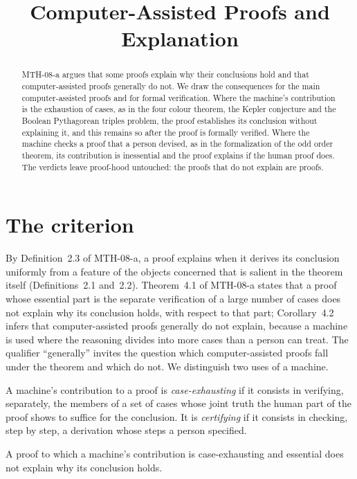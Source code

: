 \documentclass{situationist-preprint}
\title{Computer-Assisted Proofs and Explanation}
\begin{document}
\maketitle

\begin{abstract}
MTH-08-a argues that some proofs explain why their conclusions hold and that computer-assisted proofs generally do not. We draw the consequences for the main computer-assisted proofs and for formal verification. Where the machine's contribution is the exhaustion of cases, as in the four colour theorem, the Kepler conjecture and the Boolean Pythagorean triples problem, the proof establishes its conclusion without explaining it, and this remains so after the proof is formally verified. Where the machine checks a proof that a person devised, as in the formalization of the odd order theorem, its contribution is inessential and the proof explains if the human proof does. The verdicts leave proof-hood untouched: the proofs that do not explain are proofs.
\end{abstract}

\section{The criterion}

By Definition~2.3 of MTH-08-a, a proof explains when it derives its conclusion uniformly from a feature of the objects concerned that is salient in the theorem itself (Definitions~2.1 and~2.2). Theorem~4.1 of MTH-08-a states that a proof whose essential part is the separate verification of a large number of cases does not explain why its conclusion holds, with respect to that part; Corollary~4.2 infers that computer-assisted proofs generally do not explain, because a machine is used where the reasoning divides into more cases than a person can treat. The qualifier \enquote{generally} invites the question which computer-assisted proofs fall under the theorem and which do not. We distinguish two uses of a machine.

\begin{definition}
A machine's contribution to a proof is \emph{case-exhausting} if it consists in verifying, separately, the members of a set of cases whose joint truth the human part of the proof shows to suffice for the conclusion. It is \emph{certifying} if it consists in checking, step by step, a derivation whose steps a person specified.
\end{definition}

\begin{proposition}\label{p:ce}
A proof to which a machine's contribution is case-exhausting and essential does not explain why its conclusion holds.
\end{proposition}
\end{document}
